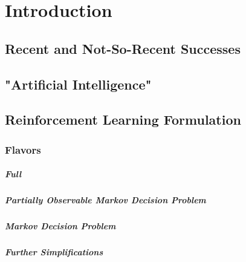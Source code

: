 \chapter{Introduction} %

    \section{Recent and Not-So-Recent Successes} %

    \section{"Artificial Intelligence"} %

    \section{Reinforcement Learning Formulation} %

        \subsection{Flavors} %

            \paragraph{Full} %

            \paragraph{Partially Observable Markov Decision Problem} %

            \paragraph{Markov Decision Problem} %

            \paragraph{Further Simplifications} %

